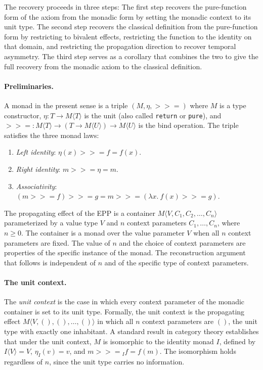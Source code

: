  The recovery proceeds in three steps: The first step recovers the pure-function form of the axiom from the monadic form by setting the monadic context to its unit type. The second step recovers the classical definition from the pure-function form by restricting to bivalent effects, restricting the function to the identity on that domain, and restricting the propagation direction to recover temporal asymmetry. The third step serves as a corollary that combines the two to give the full recovery from the monadic axiom to the classical definition.
 

\paragraph{Preliminaries.}
A monad in the present sense is a triple $(M, \eta, \mathbin{>\!\!>\!\!=})$ where $M$ is a type constructor, $\eta : T \to M\langle T \rangle$ is the unit (also called \texttt{return} or \texttt{pure}), and $\mathbin{>\!\!>\!\!=} : M\langle T \rangle \to (T \to M\langle U \rangle) \to M\langle U \rangle$ is the bind operation. The triple satisfies the three monad laws:
 
\begin{enumerate}
\item \emph{Left identity}: $\eta(x) \mathbin{>\!\!>\!\!=} f = f(x)$.
\item \emph{Right identity}: $m \mathbin{>\!\!>\!\!=} \eta = m$.
\item \emph{Associativity}: $(m \mathbin{>\!\!>\!\!=} f) \mathbin{>\!\!>\!\!=} g = m \mathbin{>\!\!>\!\!=} (\lambda x.\ f(x) \mathbin{>\!\!>\!\!=} g)$.
\end{enumerate}
 
\noindent The propagating effect of the EPP is a container $M\langle V, C_1, C_2, \ldots, C_n \rangle$ parameterized by a value type $V$ and $n$ context parameters $C_1, \ldots, C_n$, where $n \geq 0$. The container is a monad over the value parameter $V$ when all $n$ context parameters are fixed. The value of $n$ and the choice of context parameters are properties of the specific instance of the monad. The reconstruction argument that follows is independent of $n$ and of the specific type of context parameters.


\paragraph{The unit context.}
The \emph{unit context} is the case in which every context parameter of the monadic container is set to its unit type. Formally, the unit context is the propagating effect $M\langle V, (), (), \ldots, () \rangle$ in which all $n$ context parameters are $()$, the unit type with exactly one inhabitant. A standard result in category theory establishes that under the unit context, $M$ is isomorphic to the identity monad $I$, defined by $I\langle V \rangle = V$, $\eta_I(v) = v$, and $m \mathbin{>\!\!>\!\!=}_I f = f(m)$. The isomorphism holds regardless of $n$, since the unit type carries no information.



